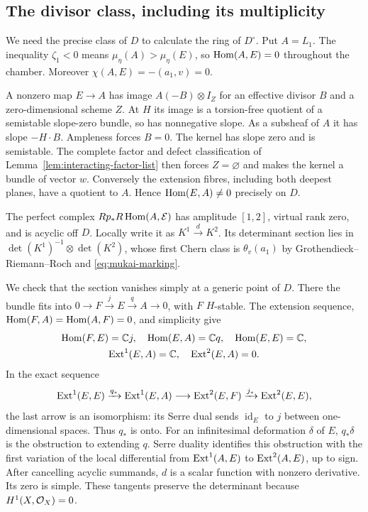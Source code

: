 \subsection{The divisor class, including its multiplicity}
We need the precise class of $D$ to calculate the
ring of $D^\circ$. Put $A=L_1$. The inequality
$\zeta_1<0$ means $\mu_\eta(A)>\mu_\eta(E)$,
so $\operatorname{Hom}(A,E)=0$ throughout the chamber.
Moreover $\chi(A,E)=-(a_1,v)=0$.

A nonzero map $E\to A$ has image
$A(-B)\otimes I_Z$ for an effective divisor $B$
and a zero-dimensional scheme $Z$. At $H$ its
image is a torsion-free quotient of a semistable
slope-zero bundle, so has nonnegative slope.
As a subsheaf of $A$ it has slope $-H\cdot B$.
Ampleness forces $B=0$. The kernel has slope zero
and is semistable. The complete factor and defect
classification of Lemma~\ref{lem:interacting-factor-list}
then forces $Z=\varnothing$ and makes the kernel
a bundle of vector $w$. Conversely the extension
fibres, including both deepest planes, have a
quotient to $A$. Hence $\operatorname{Hom}(E,A)\ne0$ precisely
on $D$.

The perfect complex $Rp_*R\operatorname{Hom}(A,\mathcal E)$ has
amplitude $[1,2]$, virtual rank zero, and is
acyclic off $D$. Locally write it as
$K^1\xrightarrow{d}K^2$. Its determinant section
lies in $\det(K^1)^{-1}\otimes\det(K^2)$, whose
first Chern class is $\theta_v(a_1)$ by
Grothendieck--Riemann--Roch and
\eqref{eq:mukai-marking}.

We check that the section vanishes simply at a
generic point of $D$. There the bundle fits into
$0\to F\xrightarrow{j}E\xrightarrow{q}A\to0$,
with $F$ $H$-stable. The extension sequence,
$\operatorname{Hom}(F,A)=\operatorname{Hom}(A,F)=0$, and simplicity give
\[
 \begin{gathered}
 \operatorname{Hom}(F,E)=\mathbb C j,\quad \operatorname{Hom}(E,A)=\mathbb C q,\quad
 \operatorname{Hom}(E,E)=\mathbb C,\\
 \operatorname{Ext}^1(E,A)=\mathbb C,\quad
 \operatorname{Ext}^2(E,A)=0.
 \end{gathered}
\]
In the exact sequence
\[
 \operatorname{Ext}^1(E,E)\xrightarrow{q_*}\operatorname{Ext}^1(E,A)
 \longrightarrow\operatorname{Ext}^2(E,F)
 \xrightarrow{j_*}\operatorname{Ext}^2(E,E),
\]
the last arrow is an isomorphism: its Serre dual
sends $\operatorname{id}_E$ to $j$ between
one-dimensional spaces. Thus $q_*$ is onto.
For an infinitesimal deformation $\delta$ of $E$,
$q_*\delta$ is the obstruction to extending $q$.
Serre duality identifies this obstruction with
the first variation of the local differential
from $\operatorname{Ext}^1(A,E)$ to $\operatorname{Ext}^2(A,E)$, up to sign.
After cancelling acyclic summands, $d$ is a scalar
function with nonzero derivative. Its zero is
simple. These tangents preserve the determinant
because $H^1(X,\mathcal O_X)=0$.

